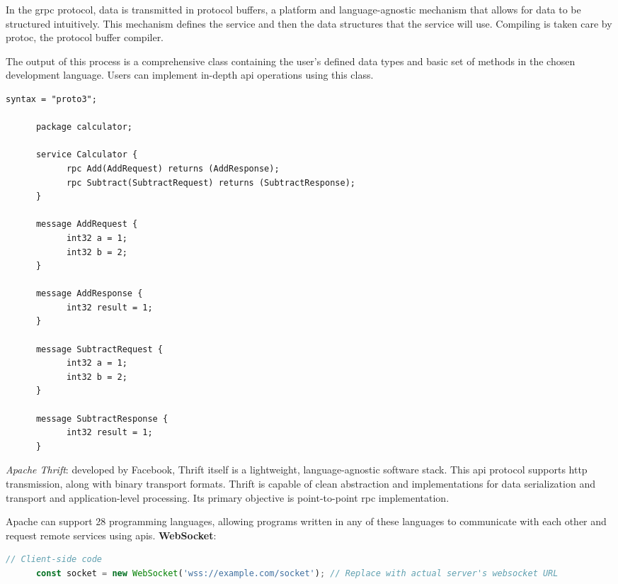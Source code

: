 \begin{multicols}{2}
\begin{multicols}{2}
      In the \acrshort{grpc} protocol, data is transmitted in protocol buffers, a platform and language-agnostic mechanism
      that allows for data to be structured intuitively. This mechanism defines the service and then the data structures
      that the service will use. Compiling is taken care by protoc, the protocol buffer compiler.

      The output of this process is a comprehensive class containing the user's defined data types and basic set of methods
      in the chosen development language. Users can implement in-depth \acrshort{api} operations using this class.
\end{multicols}

\begin{lstlisting}[caption=gRPC Service For a Calculator In a Protobuf File]
      syntax = "proto3";

      package calculator;

      service Calculator {
            rpc Add(AddRequest) returns (AddResponse);
            rpc Subtract(SubtractRequest) returns (SubtractResponse);
      }

      message AddRequest {
            int32 a = 1;
            int32 b = 2;
      }

      message AddResponse {
            int32 result = 1;
      }

      message SubtractRequest {
            int32 a = 1;
            int32 b = 2;
      }

      message SubtractResponse {
            int32 result = 1;
      }
\end{lstlisting}

\begin{multicols}{2}
      \textit{Apache Thrift}: developed by Facebook, Thrift itself is a lightweight, language-agnostic software stack.
      This \acrshort{api} protocol supports \acrshort{http} transmission, along with binary transport formats. Thrift
      is capable of clean abstraction and implementations for data serialization and transport and application-level
      processing. Its primary objective is point-to-point \acrshort{rpc} implementation.

      Apache can support 28 programming languages, allowing programs written in any of these languages to communicate
      with each other and request remote services using \acrshort{api}s.
      \textbf{WebSocket}:
\end{multicols}

\begin{lstlisting}[language=JavaScript, caption=WebSocket's Example]
      // Client-side code
      const socket = new WebSocket('wss://example.com/socket'); // Replace with actual server's websocket URL
      

\end{lstlisting}
\end{multicols}

